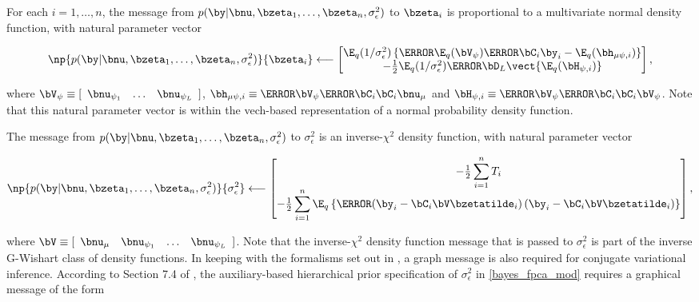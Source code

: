 \documentclass[12pt]{article}
\def\sigsqeps{\sigma^2_{\epsilon}}
\def\numu{\bnu_\mu}
\def\Vpsi{\bV_\psi}
\newcommand\nupsi[1]{\bnu_{\psi_{#1}}}
\newcommand\hmupsi[1]{\bh_{\mu \psi, i}}
\newcommand\Hpsi[1]{\bH_{\psi, i}}
\theoremstyle{plain}
\theoremstyle{definition}
\theoremstyle{remark}
\begin{document}
For each $i = 1, \dots, n$, the message from $p (\by | \bnu, \bzeta_1, \dots, \bzeta_n, \sigsqeps)$ to $\bzeta_i$
is proportional to a multivariate normal density function, with natural parameter vector

\begin{equation}
	\np{p (\by | \bnu, \bzeta_1, \dots, \bzeta_n, \sigsqeps)}{\bzeta_i}
		\longleftarrow
			\begin{bmatrix}
				\E_q (1/\sigsqeps) \left\{
					\T{\E_q (\Vpsi)} \T{\bC_i} \by_i - \E_q (\hmupsi{i})
				\right\} \\
				-\frac12 \E_q (1/\sigsqeps) \T{\bD_L} \vect \{ \E_q (\Hpsi{i}) \}
			\end{bmatrix},
\label{np_lik_zeta}
\end{equation}

\noindent where $ \Vpsi \equiv [\begin{array}{ccc} \nupsi{1} & \dots & \nupsi{L} \end{array}]$,
$\hmupsi{i} \equiv \T{\Vpsi} \T{\bC_i} \bC_i \numu$ and $\Hpsi{i} \equiv \T{\Vpsi} \T{\bC_i} \bC_i \Vpsi$.
Note that this natural parameter vector is within the vech-based representation of a normal probability density function.

The message from $p (\by | \bnu, \bzeta_1, \dots, \bzeta_n, \sigsqeps)$ to $\sigsqeps$
is an inverse-$\chi^2$ density function, with natural parameter vector

\begin{equation}
	\np{p (\by | \bnu, \bzeta_1, \dots, \bzeta_n, \sigsqeps)}{\sigsqeps}
		\longleftarrow
			\begin{bmatrix}
				-\frac12 \displaystyle\sum_{i=1}^n T_i \\
				-\frac12 \displaystyle\sum_{i=1}^n \E_q \left\{ \T{\left(
					\by_i - \bC_i \bV \bzetatilde_i
				\right)} \left(
					\by_i - \bC_i \bV \bzetatilde_i
				\right) \right\}
			\end{bmatrix},
\label{np_lik_sigsqeps}
\end{equation}

\noindent where $\bV \equiv [\begin{array}{cccc} \numu & \nupsi{1} & \dots & \nupsi{L} \end{array}]$.
Note that the inverse-$\chi^2$ density function message that is passed
to $\sigsqeps$ is part of the inverse G-Wishart class of density functions. In keeping
with the formalisms set out in ,
a graph message is also required for conjugate variational inference.
According to Section 7.4 of ,
the auxiliary-based hierarchical prior specification of $\sigsqeps$ in \eqref{bayes_fpca_mod} requires a
graphical message of the form
\end{document}
